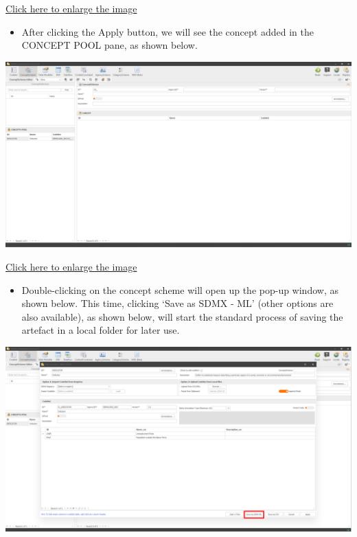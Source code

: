 \documentclass[
]{book}
\providecommand{\tightlist}{%
  \setlength{\itemsep}{0pt}\setlength{\parskip}{0pt}}
\begin{document}
\href{images/image243.png}{Click here to enlarge the image}

\begin{itemize}
\tightlist
\item
  After clicking the Apply button, we will see the concept added in the CONCEPT POOL pane, as shown below.
\end{itemize}

\begin{center}\includegraphics[width=1\linewidth]{./images/image244} \end{center}

\href{images/image244.png}{Click here to enlarge the image}

\begin{itemize}
\tightlist
\item
  Double-clicking on the concept scheme will open up the pop-up window, as shown below. This time, clicking `Save as SDMX - ML' (other options are also available), as shown below, will start the standard process of saving the artefact in a local folder for later use.
\end{itemize}

\begin{center}\includegraphics[width=1\linewidth]{./images/image245} \end{center}
\end{document}

